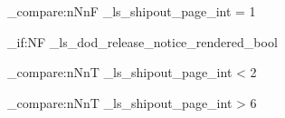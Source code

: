\documentclass[aspectratio=169,professionalfonts]{beamer}
\title{\LSTitle}
\subtitle{\LSSubtitle}
\author{\LSAuthor}
\date{\LSDate}
\begin{document}
\begin{frame}
  \titlepage
\end{frame}
\ExplSyntaxOn
\int_compare:nNnF {\g_ls_shipout_page_int} = {1}
  {\PackageError{linearspace-test}{Full-combination~presentation~title~must~remain~one~physical~slide}{}}
\ExplSyntaxOff
\LSMarkingDisclosureFrame
\ExplSyntaxOn
\bool_if:NF \g_ls_dod_release_notice_rendered_bool
  {\PackageError{linearspace-test}{Full-combination~presentation~did~not~render~the~required~release~notice}{}}
\int_compare:nNnT {\g_ls_shipout_page_int} < {2}
  {\PackageError{linearspace-test}{Full-combination~presentation~disclosure~frame~did~not~ship}{}}
\int_compare:nNnT {\g_ls_shipout_page_int} > {6}
  {\PackageError{linearspace-test}{Full-combination~presentation~disclosure~exceeded~the~six-slide~layout~cap}{}}
\ExplSyntaxOff
\end{document}
